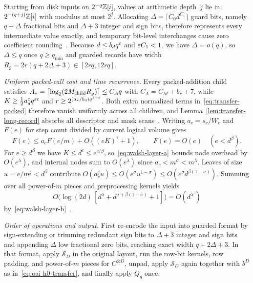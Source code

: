 Starting from disk inputs on $2^{-q}\mathbb{Z}[i]$, values at arithmetic depth~$j$ lie in $2^{-(q+j)}\mathbb{Z}[i]$ with modulus at most $2^j$. Allocating $\Delta=\lceil C_0d^{C_1}\rceil$ guard bits, namely $q+\Delta$ fractional bits and $\Delta+3$ integer and sign bits, therefore represents every intermediate value exactly, and temporary bit-level interchanges cause zero coefficient rounding~\cite[\S5.4, p.~36]{OAI26}. Because $d\le b_dq^\varepsilon$ and $\varepsilon C_1<1$, we have $\Delta=o(q)$, so $\Delta\le q$ once $q\ge q_{\min}$ and guarded records have width $R_g=2r(q+2\Delta+3)\in[2rq,12rq]$.

\emph{Uniform packed-call cost and time recurrence.}
Every packed-addition child satisfies $A_*=\lceil\log_2(2M_{\rm child}R_g)\rceil\le C_Aq$ with $C_A=C_M+b_r+7$, while $K\ge\frac12a_d^cq^{\varepsilon c}$ and $r\ge2^{(a_r/b_d)q^{1-\varepsilon}}$. Both extra normalized terms in~\eqref{eq:transfer-packed} therefore vanish uniformly across all children, and Lemma~\ref{lem:transfer-long-record} absorbs all descriptor and mask scans~\cite[\S5.3, pp.~33--34 and proof of Prop.~14, \S5.4, pp.~37--38]{OAI26}. Writing $a_c=s_c/W_c$ and $F(e)$ for step count divided by current logical volume gives
\begin{equation}\label{eq:walsh-layer-recurrence}
  F(e)\le a_cF(e/m)+O((eK)^{\tau}+1),\qquad F(e)=O(e)\quad(e<d^\beta).
\end{equation}
For $e\ge d^\beta$ we have $K\le d^c\le e^{c/\beta}$, so~\eqref{eq:walsh-layer-a} bounds node overhead by $O(e^\lambda)$, and internal nodes sum to $O(e^\lambda)$ since $a_c<m^\sigma<m^\lambda$. Leaves of size $u=e/m^j<d^\beta$ contribute $O(a_c^ju)\le O(e^\sigma u^{1-\sigma})\le O(e^\sigma d^{\beta(1-\sigma)})$. Summing over all power-of-$m$ pieces and preprocessing kernels yields
\begin{equation}\label{eq:walsh-layer-unrolled}
  O\bigl(\log(2d)\,[d^{\lambda}+d^{\sigma+\beta(1-\sigma)}+1]\bigr)=O(d^{\lambda'})
\end{equation}
by~\eqref{eq:walsh-layer-b}~\cite[\S5.3, p.~34]{OAI26}.

\emph{Order of operations and output.}
First re-encode the input into guarded format by sign-extending or trimming redundant sign bits to $\Delta+3$ integer and sign bits and appending $\Delta$ low fractional zero bits, reaching exact width $q+2\Delta+3$. In that format, apply $\mathcal S_D$ in the original layout, run the row-bit kernels, row padding, and power-of-$m$ pieces for $C^{\otimes D}$, unpad, apply $\mathcal S_D$ again together with $b^D$ as in~\eqref{eq:oai-h0-transfer}, and finally apply $Q_q$ once.

